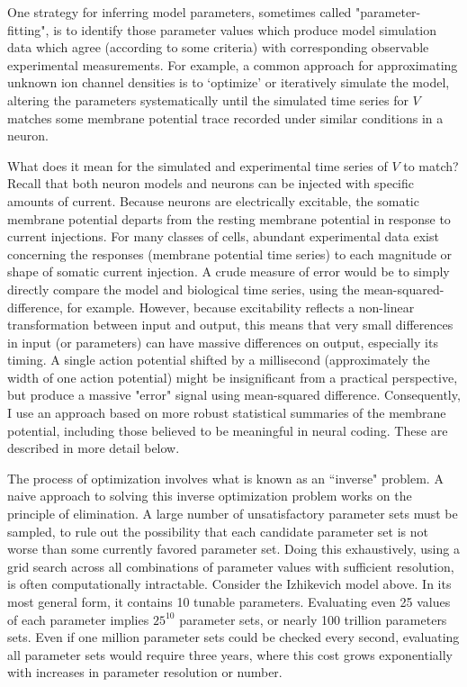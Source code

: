 One strategy for inferring model parameters, sometimes called "parameter-fitting", is to identify those parameter values which produce model simulation data which agree (according to some criteria) with corresponding observable experimental measurements.
For example, a common approach for approximating unknown ion channel densities is to ‘optimize’ or iteratively simulate the model, altering the parameters systematically until the simulated time series for $V$ matches some membrane potential trace recorded under similar conditions in a neuron.

What does it mean for the simulated and experimental time series of $V$ to match?
Recall that both neuron models and neurons can be injected with specific amounts of current. Because neurons are electrically excitable, the somatic membrane potential departs from the resting membrane potential in response to current injections.
For many classes of cells, abundant experimental data exist concerning the responses (membrane potential time series) to each magnitude or shape of somatic current injection.
A crude measure of error would be to simply directly compare the model and biological time series, using the mean-squared-difference, for example.
However, because excitability reflects a non-linear transformation between input and output, this means that very small differences in input (or parameters) can have massive differences on output, especially its timing.
A single action potential shifted by a millisecond (approximately the width of one action potential) might be insignificant from a practical perspective, but produce a massive "error" signal using mean-squared difference.
Consequently, I use an approach based on more robust statistical summaries of the membrane potential, including those believed to be meaningful in neural coding.
These are described in more detail below.

The process of optimization involves what is known as an ``inverse" problem.
A naive approach to solving this inverse optimization problem works on the principle of elimination.
A large number of unsatisfactory parameter sets must be sampled, to rule out the possibility that each candidate parameter set is not worse than some currently favored parameter set.
Doing this exhaustively, using a grid search across all combinations of parameter values with sufficient resolution, is often  computationally intractable.
Consider the Izhikevich model above.
In its most general form, it contains 10 tunable parameters.
Evaluating even 25 values of each parameter implies $25^10$ parameter sets, or nearly 100 trillion parameters sets.
Even if one million parameter sets could be checked every second, evaluating all parameter sets would require three years, where this cost grows exponentially with increases in parameter resolution or number.


